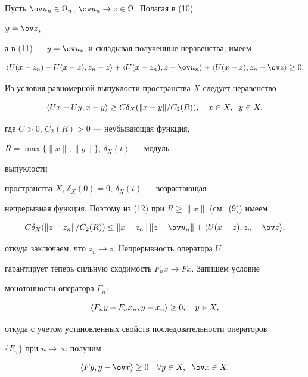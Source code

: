 Пусть $\ov u_n\in\Omega_n$, $\ov u_n\to z\in\Omega$. Полагая в (10) 


$y=\ov z$, 


а в (11) --- $y=\ov u_n$ и складывая полученные неравенства, имеем 


\begin{equation} 


\la U(x-z_n)-U(x-z),z_n-z\ra+ 


\la U(x-z_n),z-\ov u_n\ra + 


\la U(x-z),z_n-\ov z\ra\ge 0. 


\end{equation} 


Из условия равномерной выпуклости пространства $X$ следует неравенство 


\cite{10}


$$ 


\la Ux-Uy,x-y\ra\ge C\delta_X(\|x-y\|/C_2(R)),\quad 


x\in X,\ \; y\in X, 


$$ 


где $C>0$, $C_2(R)>0$ --- неубывающая функция, 


$R=\max\{\|x\|,\|y\|\}$, $\delta_X(t)$ --- модуль 


выпуклости 


пространства $X$, $\delta_X(0)=0$, $\delta_X(t)$ --- возрастающая 


непрерывная функция. Поэтому из (12) при $R\ge\|x\|$ (см.~(9)) имеем 


$$ 


C\delta_X(\|z-z_n\|/C_2(R))\le 


\|x-z_n\|\,\|z-\ov u_n\|+\la U(x-z),z_n-\ov z\ra, 


$$ 


откуда заключаем, что $z_n\to z$. Непрерывность оператора $U$ 


гарантирует теперь сильную сходимость $F_n x\to Fx$. Запишем условие 


монотонности оператора $F_n$: 


$$ 


\la F_n y-F_n x_n,y-x_n\ra\ge 0,\quad y\in X, 


$$ 


откуда с учетом установленных свойств последовательности операторов 


$\{F_n\}$ при $n\to\infty$ получим 


\begin{equation} 


\la Fy,y-\ov x\ra\ge 0\quad \forall y\in X,\ \; \ov x\in X. 


\end{equation} 


